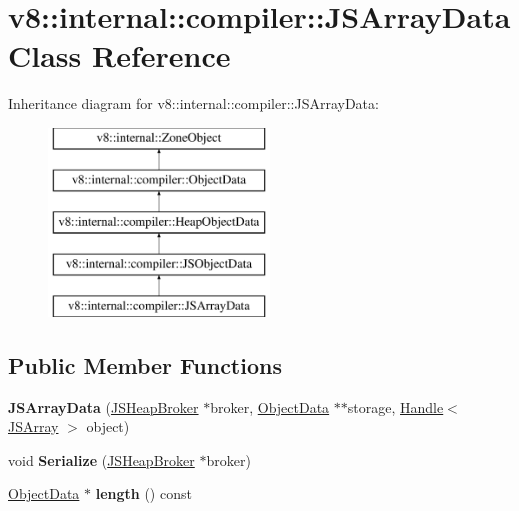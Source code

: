 \hypertarget{classv8_1_1internal_1_1compiler_1_1JSArrayData}{}\section{v8\+:\+:internal\+:\+:compiler\+:\+:J\+S\+Array\+Data Class Reference}
\label{classv8_1_1internal_1_1compiler_1_1JSArrayData}
Inheritance diagram for v8\+:\+:internal\+:\+:compiler\+:\+:J\+S\+Array\+Data\+:\begin{figure}[H]
\begin{center}
\leavevmode
\includegraphics[height=5.000000cm]{classv8_1_1internal_1_1compiler_1_1JSArrayData}
\end{center}
\end{figure}
\subsection*{Public Member Functions}
\begin{DoxyCompactItemize}
\item 
\mbox{\label{classv8_1_1internal_1_1compiler_1_1JSArrayData_a98f6dabf1ed2fdedb643feb1bdbb5494}} 
{\bfseries J\+S\+Array\+Data} (\mbox{\hyperlink{classv8_1_1internal_1_1compiler_1_1JSHeapBroker}{J\+S\+Heap\+Broker}} $\ast$broker, \mbox{\hyperlink{classv8_1_1internal_1_1compiler_1_1ObjectData}{Object\+Data}} $\ast$$\ast$storage, \mbox{\hyperlink{classv8_1_1internal_1_1Handle}{Handle}}$<$ \mbox{\hyperlink{classv8_1_1internal_1_1JSArray}{J\+S\+Array}} $>$ object)
\item 
\mbox{\label{classv8_1_1internal_1_1compiler_1_1JSArrayData_a75c7d9ad09fbf8b2a7f24dfaed66284f}} 
void {\bfseries Serialize} (\mbox{\hyperlink{classv8_1_1internal_1_1compiler_1_1JSHeapBroker}{J\+S\+Heap\+Broker}} $\ast$broker)
\item 
\mbox{\label{classv8_1_1internal_1_1compiler_1_1JSArrayData_ac3bee3d9da65114a948a138d2bdd7e20}} 
\mbox{\hyperlink{classv8_1_1internal_1_1compiler_1_1ObjectData}{Object\+Data}} $\ast$ {\bfseries length} () const
\end{DoxyCompactItemize}
